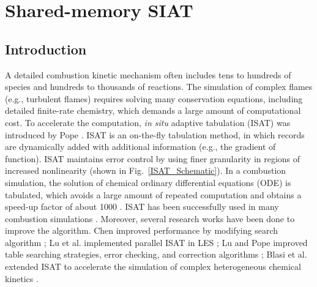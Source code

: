 \chapter{Shared-memory SIAT}
\label{parISAT}

\section{Introduction}

A detailed combustion kinetic mechanism often includes tens to hundreds of species and hundreds to thousands of reactions. The simulation of complex flames (e.g., turbulent flames) requires solving many conservation equations, including detailed finite-rate chemistry, which demands a large amount of computational cost. To accelerate the computation, \textit{in situ} adaptive tabulation (ISAT) was introduced by Pope \cite{pope1997computationally}.
ISAT is an on-the-fly tabulation method, in which records are dynamically added with additional information (e.g., the gradient of function). ISAT maintains error control by using finer granularity in regions of increased nonlinearity (shown in Fig.~\ref{ISAT_Schematic}). In a combustion simulation, the solution of chemical ordinary differential equations (ODE) is tabulated, which avoids a large amount of repeated computation and obtains a speed-up factor of about 1000 \cite{pope1997computationally}. ISAT has been successfully used in many combustion simulations \cite{pope1997computationally,gordon2007numerical,wang2003application,singer2006modeling,singer2004exploiting,tang2002implementation}. Moreover, several research works have been done to improve the algorithm. Chen improved performance by modifying search algorithm \cite{chen2004analysis}; Lu et al. implemented parallel ISAT in LES \cite{lu2005investigation}; Lu and Pope improved table searching strategies, error checking, and correction algorithms \cite{lu2009improved}; Blasi et al. extended ISAT to accelerate the simulation of complex heterogeneous chemical kinetics \cite{blasi2016situ}.


